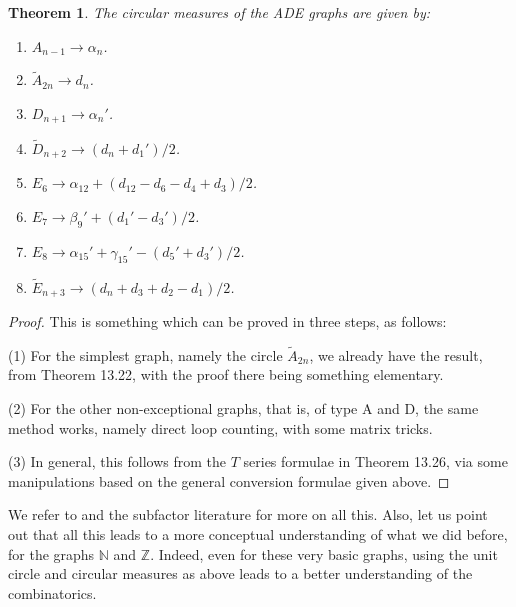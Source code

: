 \documentclass[12pt]{amsbook}
\newtheorem{theorem}{Theorem}[chapter]
\begin{document}
\begin{theorem}
The circular measures of the ADE graphs are given by:
\begin{enumerate}
\item $A_{n-1}\to\alpha_n$.

\item $\tilde{A}_{2n}\to d_n$.

\item $D_{n+1}\to\alpha_n'$.

\item $\tilde{D}_{n+2}\to (d_n+d_1')/2$.

\item $E_6\to\alpha_{12}+(d_{12}-d_6-d_4+d_3)/2$.

\item $E_7\to\beta_9'+(d_1'-d_3')/2$.

\item $E_8\to\alpha_{15}'+\gamma_{15}'-(d_5'+d_3')/2$.

\item $\tilde{E}_{n+3}\to (d_n+d_3+d_2-d_1)/2$.
\end{enumerate}
\end{theorem}

\begin{proof}
This is something which can be proved in three steps, as follows:

\medskip

(1) For the simplest graph, namely the circle $\tilde{A}_{2n}$, we already have the result, from Theorem 13.22, with the proof there being something elementary.

\medskip

(2) For the other non-exceptional graphs, that is, of type A and D, the same method works, namely direct loop counting, with some matrix tricks.

\medskip

(3) In general, this follows from the $T$ series formulae in Theorem 13.26, via some manipulations based on the general conversion formulae given above.
\end{proof}

We refer to \cite{ba2} and the subfactor literature for more on all this. Also, let us point out that all this leads to a more conceptual understanding of what we did before, for the graphs $\mathbb N$ and $\mathbb Z$. Indeed, even for these very basic graphs, using the unit circle and circular measures as above leads to a better understanding of the combinatorics.
\end{document}
